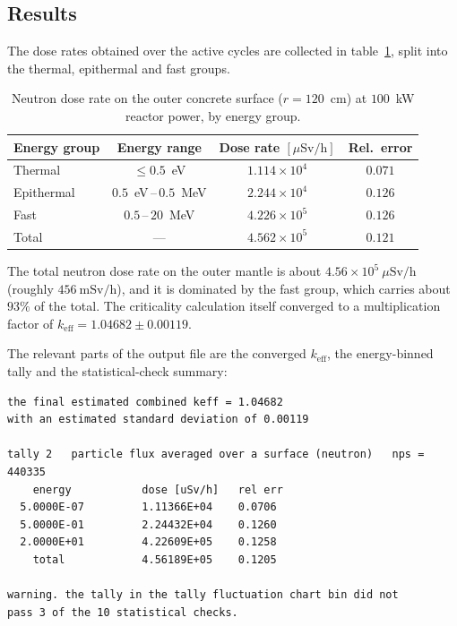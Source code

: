 

\newpage

\subsection{Results}

The dose rates obtained over the active cycles are collected in table~\ref{tab:doserate}, split into the thermal, epithermal and fast groups.

\begin{table}[H]
  \centering
  \caption{Neutron dose rate on the outer concrete surface ($r=120$~cm) at
    $100$~kW reactor power, by energy group.}
  \label{tab:doserate}
  \begin{tabular}{lccc}
    \toprule
    Energy group & Energy range & Dose rate $[\mu\mathrm{Sv/h}]$ & Rel.\ error \\
    \midrule
    Thermal     & $\leq 0.5$~eV          & $1.114\times10^{4}$ & $0.071$ \\
    Epithermal  & $0.5$~eV\,--\,$0.5$~MeV & $2.244\times10^{4}$ & $0.126$ \\
    Fast        & $0.5$\,--\,$20$~MeV     & $4.226\times10^{5}$ & $0.126$ \\
    \midrule
    Total       & ---                     & $4.562\times10^{5}$ & $0.121$ \\
    \bottomrule
  \end{tabular}
\end{table}

The total neutron dose rate on the outer mantle is about $4.56\times10^{5}~\mu\mathrm{Sv/h}$ (roughly $456~\mathrm{mSv/h}$), and it is dominated by the fast group, which carries about $93\%$ of the total.
The criticality calculation itself converged to a multiplication factor of $k_{\mathrm{eff}}=1.04682\pm0.00119$.

The relevant parts of the output file are the converged $k_{\mathrm{eff}}$, the energy-binned tally and the statistical-check summary:

\begin{lstlisting}[numbers=none]
the final estimated combined keff = 1.04682
with an estimated standard deviation of 0.00119

tally 2   particle flux averaged over a surface (neutron)   nps = 440335
    energy           dose [uSv/h]   rel err
  5.0000E-07         1.11366E+04    0.0706
  5.0000E-01         2.24432E+04    0.1260
  2.0000E+01         4.22609E+05    0.1258
    total            4.56189E+05    0.1205

warning. the tally in the tally fluctuation chart bin did not
pass 3 of the 10 statistical checks.
\end{lstlisting}

